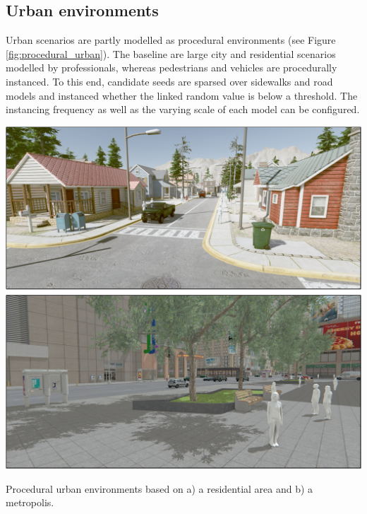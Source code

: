 \subsection{Urban environments}

Urban scenarios are partly modelled as procedural environments (see Figure \ref{fig:procedural_urban}). The baseline are large city and residential scenarios modelled by professionals, whereas pedestrians and vehicles are procedurally instanced. To this end, candidate seeds are sparsed over sidewalks and road models and instanced whether the linked random value is below a threshold. The instancing frequency as well as the varying scale of each model can be configured. 

\begin{marginfigure}[.cm]
    \centering
    \includegraphics[width=\linewidth]{figs/lidar_simulation/procedural_urban.png}
	\caption{Procedural urban environments based on a) a residential area and b) a metropolis. }
	\label{fig:procedural_urban}
\end{marginfigure}
